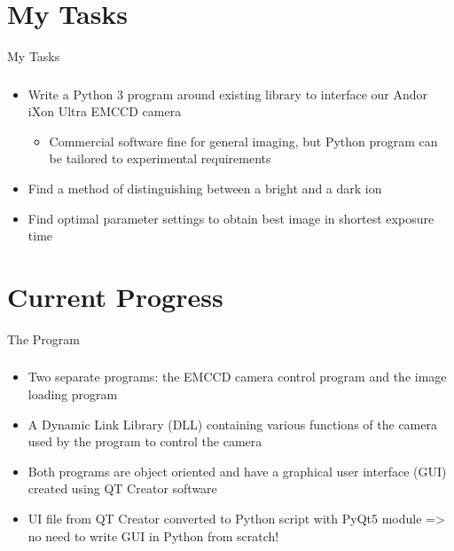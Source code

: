 \documentclass{beamer}
\begin{document}

\section{My Tasks}

\begin{frame}{My Tasks}
\frametitle{}
\begin{itemize}
\item Write a Python 3 program around existing library to interface our Andor iXon Ultra EMCCD camera
	\begin{itemize}
	\item Commercial software fine for general imaging, but Python program can be tailored to experimental requirements
	\end{itemize}
\bigskip
\item Find a method of distinguishing between a bright and a dark ion
\bigskip
\item Find optimal parameter settings to obtain best image in shortest exposure time
\end{itemize}


\end{frame}


\section{Current Progress}
\begin{frame}{The Program}
\frametitle{}

\begin{itemize}
\item Two separate programs: the EMCCD camera control program and the image loading program
\bigskip
\item A Dynamic Link Library (DLL) containing various functions of the camera used by the program to control the camera
\bigskip
\item Both programs are object oriented and have a graphical user interface (GUI) created using QT Creator software
\bigskip
\item UI file from QT Creator converted to Python script with PyQt5 module => no need to write GUI in Python from scratch!
\end{itemize} 


\end{frame}
\end{document}
